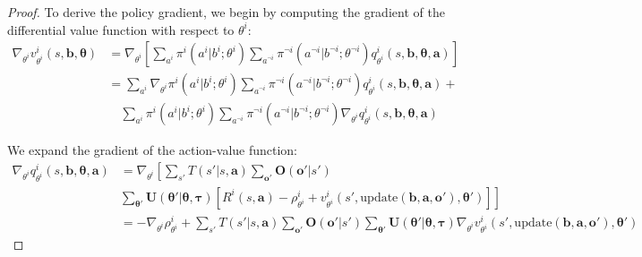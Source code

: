 \begin{proof}
    To derive the policy gradient, we begin by computing the gradient of the differential
    value function with respect to $\theta^{i}$:
    \begin{align}
        \nabla_{\theta^i}v^{i}_{\theta^i}(s, \boldsymbol{b}, \boldsymbol{\theta}) & = \nabla_{\theta^i}\left[ \sum_{a^i}\pi^{i}(a^{i}|b^{i}; \theta^{i}) \sum_{a^{\neg i}}\pi^{\neg i}(a^{\neg i}|b^{\neg i}; \theta^{\neg i}) q^{i}_{\theta^i}(s, \boldsymbol{b}, \boldsymbol{\theta}, \boldsymbol{a}) \right] \\
                                                                                  & = \sum_{a^i}\nabla_{\theta^i}\pi^{i}(a^{i}|b^{i}; \theta^{i}) \sum_{a^{\neg i}}\pi^{\neg i}(a^{\neg i}|b^{\neg i}; \theta^{\neg i}) q^{i}_{\theta^i}(s, \boldsymbol{b}, \boldsymbol{\theta}, \boldsymbol{a}) +              \\
                                                                                  & \quad \sum_{a^i}\pi^{i}(a^{i}|b^{i}; \theta^{i}) \sum_{a^{\neg i}}\pi^{\neg i}(a^{\neg i}|b^{\neg i}; \theta^{\neg i}) \nabla_{\theta^i}q^{i}_{\theta^i}(s, \boldsymbol{b}, \boldsymbol{\theta}, \boldsymbol{a})
    \end{align}

    We expand the gradient of the action-value function:
    \begin{align}
        \nabla_{\theta^i}q^{i}_{\theta^i}(s, \boldsymbol{b}, \boldsymbol{\theta}, \boldsymbol{a}) & = \nabla_{\theta^i}\left[ \sum_{s'}T(s'|s, \boldsymbol{a}) \sum_{\boldsymbol{o}'}\boldsymbol{O}(\boldsymbol{o}'|s') \right.                                                                                                                                                                                                                                           \\
                                                                                                  & \left. \sum_{\boldsymbol{\theta}'}\boldsymbol{U}(\boldsymbol{\theta}'|\boldsymbol{\theta}, \boldsymbol{\tau}) \left[ R^{i}(s, \boldsymbol{a}) - \rho^{i}_{\theta^i}+ v^{i}_{\theta^i}(s', \text{update}(\boldsymbol{b}, \boldsymbol{a}, \boldsymbol{o}'), \boldsymbol{\theta}') \right] \right]                                                                       \\
                                                                                                  & = -\nabla_{\theta^i}\rho^{i}_{\theta^i}+ \sum_{s'}T(s'|s, \boldsymbol{a}) \sum_{\boldsymbol{o}'}\boldsymbol{O}(\boldsymbol{o}'|s') \sum_{\boldsymbol{\theta}'}\boldsymbol{U}(\boldsymbol{\theta}'|\boldsymbol{\theta}, \boldsymbol{\tau}) \nabla_{\theta^i}v^{i}_{\theta^i}(s', \text{update}(\boldsymbol{b}, \boldsymbol{a}, \boldsymbol{o}'), \boldsymbol{\theta}')
    \end{align}


\end{proof}
